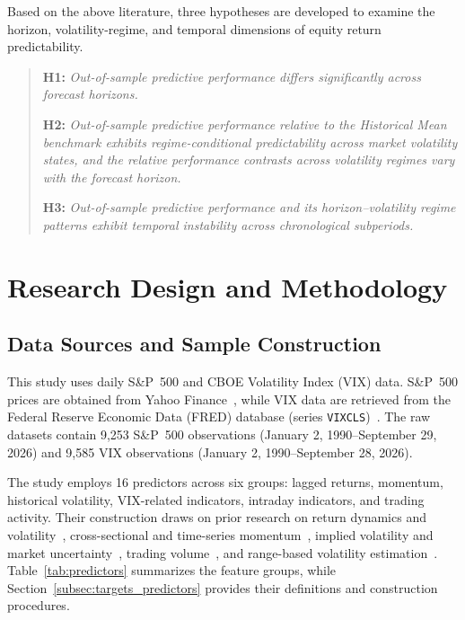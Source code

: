 \documentclass[runningheads,orivec]{llncs}
\begin{document}
Based on the above literature, three hypotheses are developed to examine the horizon, volatility-regime, and temporal dimensions of equity return predictability.

\begin{quote}
\noindent\textbf{H1:} \textit{Out-of-sample predictive performance differs significantly across forecast horizons.}

\medskip
\noindent\textbf{H2:} \textit{Out-of-sample predictive performance relative to the Historical Mean benchmark exhibits regime-conditional predictability across market volatility states, and the relative performance contrasts across volatility regimes vary with the forecast horizon.}

\medskip
\noindent\textbf{H3:} \textit{Out-of-sample predictive performance and its horizon--volatility regime patterns exhibit temporal instability across chronological subperiods.}
\end{quote}


\section{Research Design and Methodology}\label{sec:data}

\subsection{Data Sources and Sample Construction}\label{subsec:data_sources}

This study uses daily S\&P~500 and CBOE Volatility Index (VIX) data. S\&P~500 prices are obtained from Yahoo Finance~\cite{yahoosandp}, while VIX data are retrieved from the Federal Reserve Economic Data (FRED) database (series \texttt{VIXCLS})~\cite{fredvix}. The raw datasets contain 9,253 S\&P~500 observations (January 2, 1990--September 29, 2026) and 9,585 VIX observations (January 2, 1990--September 28, 2026).

The study employs 16 predictors across six groups: lagged returns, momentum, historical volatility, VIX-related indicators, intraday indicators, and trading activity. Their construction draws on prior research on return dynamics and volatility~\cite{french1987}, cross-sectional and time-series momentum~\cite{jegadeesh1993,moskowitz2012}, implied volatility and market uncertainty~\cite{banerjee2007,bekaert2014}, trading volume~\cite{campbell1993}, and range-based volatility estimation~\cite{alizadeh2002}. Table~\ref{tab:predictors} summarizes the feature groups, while Section~\ref{subsec:targets_predictors} provides their definitions and construction procedures.
\end{document}
